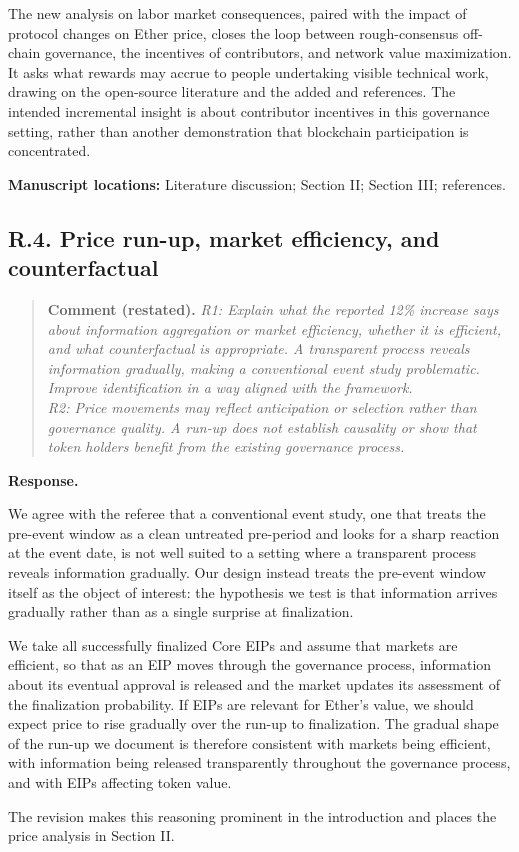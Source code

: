 \documentclass[11pt,letterpaper]{article}
\newcommand{\point}[3]{%
  \Needspace{7\baselineskip}
  \subsection*{#1. #2}\phantomsection\label{pt:#1}%
  \begin{quote}\small\textbf{Comment (restated).} \textit{#3}\end{quote}%
  \textbf{Response.}\enspace\ignorespaces}
\newcommand{\locations}[1]{\par{\small\textbf{Manuscript locations:} #1.}\par}
\begin{document}
The new analysis on labor market consequences, paired with the impact of protocol changes on Ether price, closes the loop between rough-consensus off-chain governance, the incentives of contributors, and network value maximization. It asks what rewards may accrue to people undertaking visible technical work, drawing on the open-source literature and the added \citet{Spence1973} and \citet{LernerTirole2002} references. The intended incremental insight is about contributor incentives in this governance setting, rather than another demonstration that blockchain participation is concentrated.

\locations{Literature discussion; Section II; Section III; references}

\point{R.4}{Price run-up, market efficiency, and counterfactual}{R1: Explain what the reported 12\% increase says about information aggregation or market efficiency, whether it is efficient, and what counterfactual is appropriate. A transparent process reveals information gradually, making a conventional event study problematic. Improve identification in a way aligned with the framework.\\
R2: Price movements may reflect anticipation or selection rather than governance quality. A run-up does not establish causality or show that token holders benefit from the existing governance process.}

We agree with the referee that a conventional event study, one that treats the pre-event window as a clean untreated pre-period and looks for a sharp reaction at the event date, is not well suited to a setting where a transparent process reveals information gradually. Our design instead treats the pre-event window itself as the object of interest: the hypothesis we test is that information arrives gradually rather than as a single surprise at finalization.

We take all successfully finalized Core EIPs and assume that markets are efficient, so that as an EIP moves through the governance process, information about its eventual approval is released and the market updates its assessment of the finalization probability. If EIPs are relevant for Ether's value, we should expect price to rise gradually over the run-up to finalization. The gradual shape of the run-up we document is therefore consistent with markets being efficient, with information being released transparently throughout the governance process, and with EIPs affecting token value.

The revision makes this reasoning prominent in the introduction and places the price analysis in Section II. 
\end{document}
